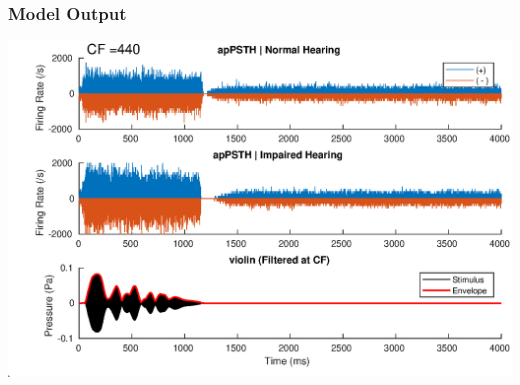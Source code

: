 \documentclass[aspectratio=1610]{beamer}
\begin{document}
\begin{frame}
\frametitle{Model Output}

\includegraphics[width = .88\textwidth]{apPSTH_violin}
\end{frame}
\end{document}
